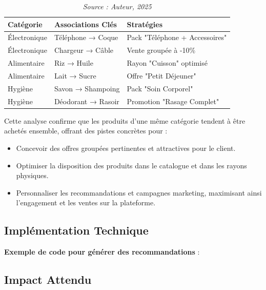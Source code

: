 \documentclass[a4paper,12pt]{article}
\begin{document}
\begin{table}[htbp]
\centering
\begin{tabular}{|l|p{4.5cm}|p{4.5cm}|}
\hline
\textbf{Catégorie} & \textbf{Associations Clés} & \textbf{Stratégies} \\
\hline
Électronique & Téléphone → Coque & Pack "Téléphone + Accessoires" \\
\hline
Électronique & Chargeur → Câble & Vente groupée à -10\% \\
\hline
Alimentaire & Riz → Huile & Rayon "Cuisson" optimisé \\
\hline
Alimentaire & Lait → Sucre & Offre "Petit Déjeuner" \\
\hline
Hygiène & Savon → Shampoing & Pack "Soin Corporel" \\
\hline
Hygiène & Déodorant → Rasoir & Promotion "Rasage Complet" \\
\hline
\end{tabular}
\caption{Stratégies de cross-selling par catégorie de produits (Top 10)}
\caption*{\textit{Source : Auteur, 2025}}
\label{tab:cross_selling_strategies_top10}
\end{table}

Cette analyse confirme que les produits d'une même catégorie tendent à être achetés ensemble, offrant des pistes concrètes pour :  
\begin{itemize}
    \item Concevoir des offres groupées pertinentes et attractives pour le client.  
    \item Optimiser la disposition des produits dans le catalogue et dans les rayons physiques.  
    \item Personnaliser les recommandations et campagnes marketing, maximisant ainsi l'engagement et les ventes sur la plateforme.
\end{itemize}
\subsection{Implémentation Technique}
\textbf{Exemple de code pour générer des recommandations} :



\subsection{Impact Attendu}
\end{document}
